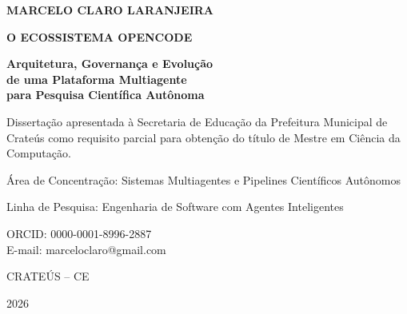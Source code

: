 \thispagestyle{empty}
\begin{center}
  \vspace*{2cm}
  {\Large\bfseries MARCELO CLARO LARANJEIRA\par}
  \vspace{2cm}
  {\LARGE\bfseries O ECOSSISTEMA OPENCODE\par}
  \vspace{0.3cm}
  {\large\bfseries Arquitetura, Governança e Evolução\\ de uma Plataforma Multiagente\\ para Pesquisa Científica Autônoma\par}

  \vspace{3cm}
  \begin{flushright}
    \begin{minipage}{10cm}
      \small
      Dissertação apresentada à Secretaria de Educação da Prefeitura Municipal de Crateús como requisito parcial para obtenção do título de Mestre em Ciência da Computação.

      \vspace{1cm}
      Área de Concentração: Sistemas Multiagentes e Pipelines Científicos Autônomos

      \vspace{1cm}
      Linha de Pesquisa: Engenharia de Software com Agentes Inteligentes

      \vspace{0.5cm}
      ORCID: 0000-0001-8996-2887\\
      E-mail: marceloclaro@gmail.com
    \end{minipage}
  \end{flushright}

  \vfill
  {\large CRATEÚS -- CE\par}
  {\large 2026\par}
\end{center}
\newpage
